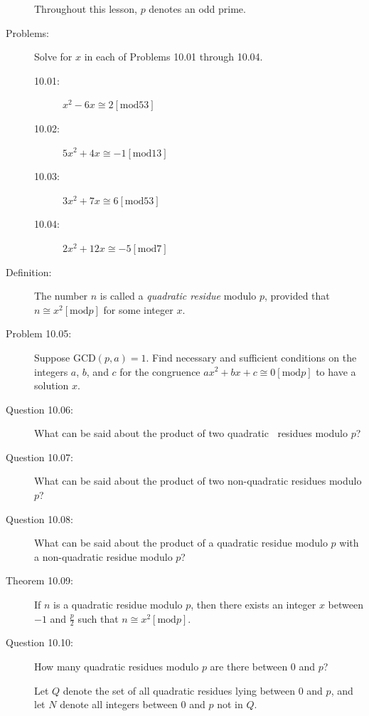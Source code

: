 \documentclass{article}
\begin{document}
\begin{description}

  \item[] Throughout this lesson, $p$ denotes an odd prime.

  \item[Problems:] Solve for $x$ in each of Problems 10.01 through 10.04.
    \begin{description}
      \item[10.01:] $x^2-6x \cong 2 [\text{mod} 53]$
      \item[10.02:] $5x^2+4x \cong -1 [\text{mod} 13]$
      \item[10.03:] $3x^2+7x \cong 6 [\text{mod} 53]$
      \item[10.04:] $2x^2+12x \cong -5 [\text{mod} 7]$
    \end{description}

  \item[Definition:] The number $n$ is called a \emph{quadratic residue} modulo $p$, provided that $n \cong x^2 [\text{mod} p]$ for some integer $x$.

  \item[Problem 10.05:] Suppose $\text{GCD}(p,a) = 1$. Find necessary and sufficient conditions on the integers $a$, $b$, and $c$ for the congruence $ax^2+bx+c \cong 0 [\text{mod} p]$ to have a solution $x$.

  \item[Question 10.06:] What can be said about the product of two quadratic $\ $ residues modulo $p$?

  \item[Question 10.07:] What can be said about the product of two non-quadratic residues modulo $p$?

  \item[Question 10.08:] What can be said about the product of a quadratic residue modulo $p$ with a non-quadratic residue modulo $p$?

  \item[Theorem 10.09:] If $n$ is a quadratic residue modulo $p$, then there exists an integer $x$ between $-1$ and $\frac{p}{2}$ such that $n \cong x^2 [\text{mod} p]$.

  \item[Question 10.10:] How many quadratic residues modulo $p$ are there between $0$ and $p$?

  \item[] Let $Q$ denote the set of all quadratic residues lying between $0$ and $p$, and let $N$ denote all integers between $0$ and $p$ not in $Q$.


\end{description}
\end{document}

